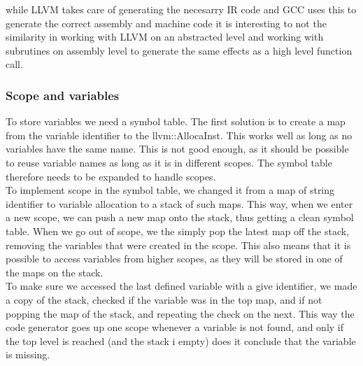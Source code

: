 while LLVM takes care of generating the necesarry IR code and GCC uses this to
generate the correct assembly and machine code it is interesting to not the
similarity in working with LLVM on an abstracted level and working with subrutines on
assembly level to generate the same effects as a high level function call.


\subsubsection{Scope and variables}
To store variables we need a symbol table. The first solution is to create a map from the variable identifier to the llvm::AllocaInst. This works well as long as no variables have the same name. This is not good enough, as it should be possible to reuse variable names as long as it is in different scopes. The symbol table therefore needs to be expanded to handle scopes.\\
To implement scope in the symbol table, we changed it from a map of string identifier to variable allocation to a stack of such maps. This way, when we enter a new scope, we can push a new map onto the stack, thus getting a clean symbol table. When we go out of scope, we the simply pop the latest map off the stack, removing the variables that were created in the scope. This also means that it is possible to access variables from higher scopes, as they will be stored in one of the maps on the stack.\\
To make sure we accessed the last defined variable with a give identifier, we made a copy of the stack, checked if the variable was in the top map, and if not popping the map of the stack, and repeating the check on the next. This way the code generator goes up one scope whenever a variable is not found, and only if the top level is reached (and the stack i empty) does it conclude that the variable is missing.

